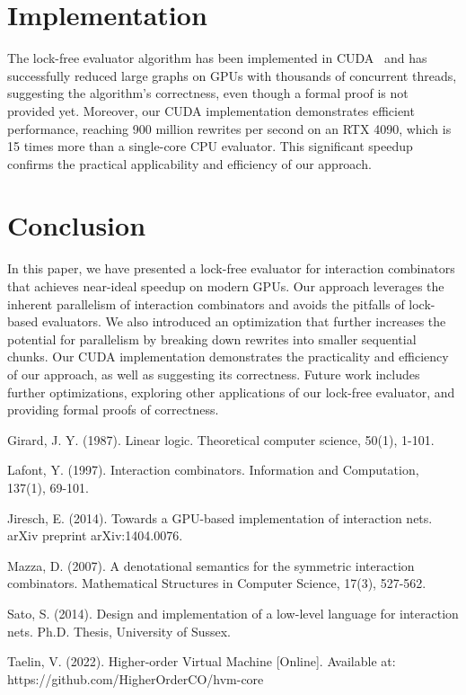 \documentclass{article}
\begin{document}
\section{Implementation}\label{s:implementation}

The lock-free evaluator algorithm has been implemented in CUDA~\cite{taelin2022lock} and has successfully reduced large graphs on GPUs with thousands of concurrent threads, suggesting the algorithm's correctness, even though a formal proof is not provided yet. Moreover, our CUDA implementation demonstrates efficient performance, reaching 900 million rewrites per second on an RTX 4090, which is 15 times more than a single-core CPU evaluator. This significant speedup confirms the practical applicability and efficiency of our approach.

\section{Conclusion}\label{s:conclusion}

In this paper, we have presented a lock-free evaluator for interaction combinators that achieves near-ideal speedup on modern GPUs. Our approach leverages the inherent parallelism of interaction combinators and avoids the pitfalls of lock-based evaluators. We also introduced an optimization that further increases the potential for parallelism by breaking down rewrites into smaller sequential chunks. Our CUDA implementation demonstrates the practicality and efficiency of our approach, as well as suggesting its correctness. Future work includes further optimizations, exploring other applications of our lock-free evaluator, and providing formal proofs of correctness.

\begin{thebibliography}{9}
Girard, J. Y. (1987). Linear logic. Theoretical computer science, 50(1), 1-101.

Lafont, Y. (1997). Interaction combinators. Information and Computation, 137(1), 69-101.

Jiresch, E. (2014). Towards a GPU-based implementation of interaction nets. arXiv preprint arXiv:1404.0076.

Mazza, D. (2007). A denotational semantics for the symmetric interaction combinators. Mathematical Structures in Computer Science, 17(3), 527-562.

Sato, S. (2014). Design and implementation of a low-level language for interaction nets. Ph.D. Thesis, University of Sussex.

Taelin, V. (2022). Higher-order Virtual Machine [Online]. Available at: https://github.com/HigherOrderCO/hvm-core
\end{thebibliography}
\end{document}
